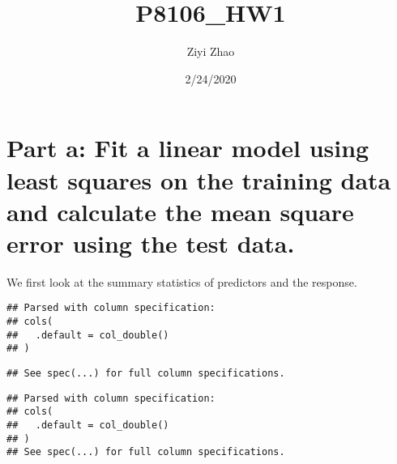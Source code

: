 \documentclass[]{article}
\title{P8106\_HW1}
\author{Ziyi Zhao}
\date{2/24/2020}
\newenvironment{Shaded}{\begin{snugshade}}{\end{snugshade}}
\newcommand{\KeywordTok}[1]{\textcolor[rgb]{0.13,0.29,0.53}{\textbf{#1}}}
\newcommand{\NormalTok}[1]{#1}
\newcommand{\OperatorTok}[1]{\textcolor[rgb]{0.81,0.36,0.00}{\textbf{#1}}}
\newcommand{\StringTok}[1]{\textcolor[rgb]{0.31,0.60,0.02}{#1}}
\begin{document}
\maketitle

\hypertarget{part-a-fit-a-linear-model-using-least-squares-on-the-training-data-and-calculate-the-mean-square-error-using-the-test-data.}{%
\section{Part a: Fit a linear model using least squares on the training
data and calculate the mean square error using the test
data.}\label{part-a-fit-a-linear-model-using-least-squares-on-the-training-data-and-calculate-the-mean-square-error-using-the-test-data.}}

We first look at the summary statistics of predictors and the response.

\begin{Shaded}
\end{Shaded}

\begin{verbatim}
## Parsed with column specification:
## cols(
##   .default = col_double()
## )
\end{verbatim}

\begin{verbatim}
## See spec(...) for full column specifications.
\end{verbatim}

\begin{Shaded}
\end{Shaded}

\begin{verbatim}
## Parsed with column specification:
## cols(
##   .default = col_double()
## )
## See spec(...) for full column specifications.
\end{verbatim}
\end{document}
